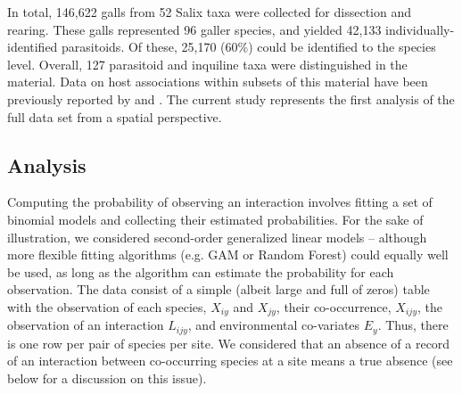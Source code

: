 \documentclass[12pt]{article}
\begin{document}
In total, 146,622 galls from 52 Salix taxa were collected for dissection and
rearing. These galls represented 96 galler species, and yielded 42,133
individually-identified parasitoids. Of these, 25,170 (60\%) could be
identified to the species level. Overall, 127 parasitoid and inquiline taxa were
distinguished in the material. Data on host associations within subsets of
this material have been previously reported by \citep{Kopelke1999} and
\citep{Nyman2007}. The current study represents the first analysis of
the full data set from a spatial perspective.

\subsection*{Analysis}

Computing the probability of observing an interaction involves fitting a set
of binomial models and collecting their estimated probabilities. For the sake
of illustration, we considered second-order generalized linear models –
although more flexible fitting algorithms (e.g. GAM or Random Forest) could
equally well be used, as long as the algorithm can estimate the probability
for each observation. The data consist of a simple (albeit large and full of
zeros) table with the observation of each species, $X_{iy}$ and $X_{jy}$,
their co-occurrence, $X_{ijy}$, the observation of an interaction $L_{ijy}$,
and environmental co-variates $E_y$. Thus, there is one row per pair of
species per site. We considered that an absence of a record of an interaction
between co-occurring species at a site means a true absence (see below for a
discussion on this issue).
\end{document}
